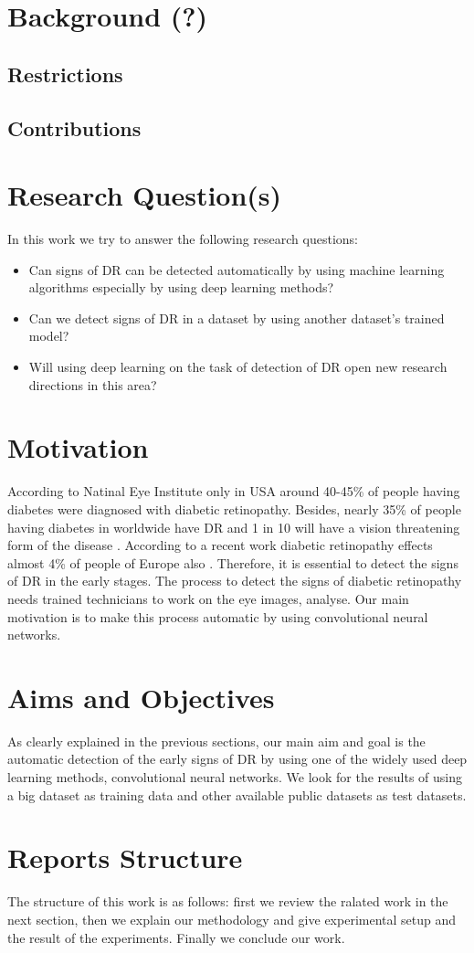 \section{Background (?)} 

\subsection{Restrictions}
\subsection{Contributions}



\section{Research Question(s)}
In this work we try to answer the following research questions:

\begin{itemize}
    \item Can signs of DR can be detected automatically by using machine learning algorithms especially by using deep learning methods?
    \item Can we detect signs of DR in a dataset by using another dataset's trained model?
    \item Will using deep learning on the task of detection of DR open new research directions in this area? 
\end{itemize}
\section{Motivation}
According to Natinal Eye Institute only in USA around 40-45\% of people having diabetes were diagnosed with diabetic retinopathy. Besides, nearly 35\% of people having diabetes in worldwide have DR and 1 in 10 will have a vision threatening form of the disease \citep{yau2012global}. According to a recent work diabetic retinopathy effects almost 4\% of people of Europe also \citep{nentwich2015diabetic}. Therefore, it is essential to detect the signs of DR in the early stages. The process to detect the signs of diabetic retinopathy needs trained technicians to work on the eye images, analyse. Our main motivation is to make this process automatic by using convolutional neural networks.
\section{Aims and Objectives}
As clearly explained in the previous sections, our main aim and goal is the automatic detection of the early signs of DR by using one of the widely used deep learning methods, convolutional neural networks. We look for the results of using a big dataset as training data and other available public datasets as test datasets. 
\section{Reports Structure}
The structure of this work is as follows: first we review the ralated work in the next section, then we explain our methodology and give experimental setup and the result of the experiments. Finally we conclude our work. 
